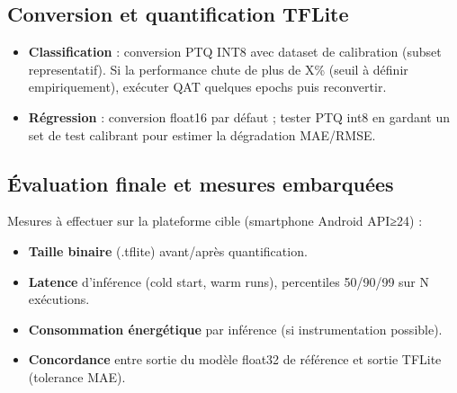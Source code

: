 \subsection{Conversion et quantification TFLite}

\begin{itemize}
    \item \textbf{Classification} : conversion PTQ INT8 avec dataset de calibration (subset representatif). Si la performance chute de plus de X\% (seuil à définir empiriquement), exécuter QAT quelques epochs puis reconvertir.
    \item \textbf{Régression} : conversion float16 par défaut ; tester PTQ int8 en gardant un set de test calibrant pour estimer la dégradation MAE/RMSE.
\end{itemize}

\subsection{Évaluation finale et mesures embarquées}

Mesures à effectuer sur la plateforme cible (smartphone Android API≥24) :
\begin{itemize}
    \item \textbf{Taille binaire} (.tflite) avant/après quantification.
    \item \textbf{Latence} d'inférence (cold start, warm runs), percentiles 50/90/99 sur N exécutions.
    \item \textbf{Consommation énergétique} par inférence (si instrumentation possible).
    \item \textbf{Concordance} entre sortie du modèle float32 de référence et sortie TFLite (tolerance MAE).
\end{itemize}





